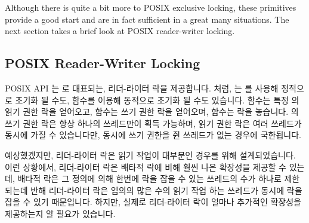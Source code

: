 Although there is quite a bit more to POSIX exclusive locking, these
primitives provide a good start and are in fact sufficient in a great
many situations.
The next section takes a brief look at POSIX reader-writer locking.
\fi

\subsection{POSIX Reader-Writer Locking}
\label{sec:toolsoftrade:POSIX Reader-Writer Locking}

POSIX API 는  로 대표되는, 리더-라이터 락을 제공합니다.
 처럼,  는
 를 사용해 정적으로 초기화 될 수도,
 함수를 이용해 동적으로 초기화 될 수도 있습니다.
 함수는 특정  의 읽기 권한
락을 얻어오고,  함수는 쓰기 권한 락을 얻어오며,
 함수는 락을 놓습니다.
 의 쓰기 권한 락은 항상 하나의 쓰레드만이 획득 가능하며,
읽기 권한 락은 여러 쓰레드가 동시에 가질 수 있습니다만, 동시에 쓰기 권한을 쥔
쓰레드가 없는 경우에 국한됩니다.

예상했겠지만, 리더-라이터 락은 읽기 작업이 대부분인 경우를 위해 설계되었습니다.
이런 상황에서, 리더-라이터 락은 배타적 락에 비해 훨씬 나은 확장성을 제공할 수
있는데, 배타적 락은 그 정의에 의해 한번에 락을 잡을 수 있는 쓰레드의 수가
하나로 제한되는데 반해 리더-라이터 락은 임의의 많은 수의 읽기 작업 하는
쓰레드가 동시에 락을 잡을 수 있기 때문입니다.
하지만, 실제로 리더-라이터 락이 얼마나 추가적인 확장성을 제공하는지 알 필요가
있습니다.

